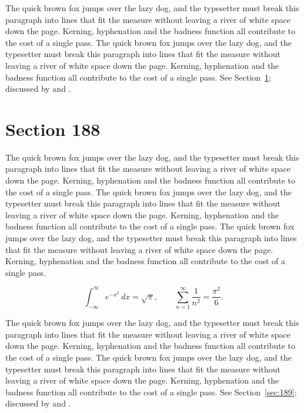 \documentclass{article}
\begin{document}
The quick brown fox jumps over the lazy dog, and the typesetter must break this paragraph into lines that fit the measure without leaving a river of white space down the page. Kerning, hyphenation and the badness function all contribute to the cost of a single pass. The quick brown fox jumps over the lazy dog, and the typesetter must break this paragraph into lines that fit the measure without leaving a river of white space down the page. Kerning, hyphenation and the badness function all contribute to the cost of a single pass. 
See Section~\ref{sec:188}; discussed by \textcite{k3} and \textcite{l5}.
\section{Section 188}
\label{sec:188}
The quick brown fox jumps over the lazy dog, and the typesetter must break this paragraph into lines that fit the measure without leaving a river of white space down the page. Kerning, hyphenation and the badness function all contribute to the cost of a single pass. The quick brown fox jumps over the lazy dog, and the typesetter must break this paragraph into lines that fit the measure without leaving a river of white space down the page. Kerning, hyphenation and the badness function all contribute to the cost of a single pass. The quick brown fox jumps over the lazy dog, and the typesetter must break this paragraph into lines that fit the measure without leaving a river of white space down the page. Kerning, hyphenation and the badness function all contribute to the cost of a single pass. 

\begin{equation}\label{eq:188}
\int_{-\infty}^{\infty} e^{-x^{2}}\,dx = \sqrt{\pi}, \qquad
\sum_{n=1}^{\infty} \frac{1}{n^{2}} = \frac{\pi^{2}}{6}.
\end{equation}

The quick brown fox jumps over the lazy dog, and the typesetter must break this paragraph into lines that fit the measure without leaving a river of white space down the page. Kerning, hyphenation and the badness function all contribute to the cost of a single pass. The quick brown fox jumps over the lazy dog, and the typesetter must break this paragraph into lines that fit the measure without leaving a river of white space down the page. Kerning, hyphenation and the badness function all contribute to the cost of a single pass. 
See Section~\ref{sec:189}; discussed by \textcite{k4} and \textcite{l1}.
\end{document}
